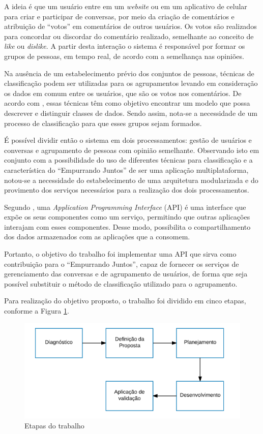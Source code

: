 A ideia é que um usuário entre em um \textit{website} ou em um aplicativo de celular para criar e participar de conversas, 
por meio da criação de comentários e atribuição de ``votos'' em comentários de outros usuários.
Os votos são realizados para concordar ou discordar do comentário realizado, semelhante ao conceito de \textit{like} ou \textit{dislike}.
A partir desta interação o sistema é responsável por formar os grupos de pessoas, em tempo real, de acordo com a semelhança nas opiniões.

Na ausência de um estabelecimento prévio dos conjuntos de pessoas, técnicas de classificação podem ser utilizadas para os agrupamentos
levando em consideração os dados em comum entre os usuários, que são os votos nos comentários.
De acordo com , essas técnicas
têm como objetivo encontrar um modelo que possa descrever e distinguir classes de dados.
Sendo assim, nota-se a necessidade de um processo de classificação para que esses grupos sejam formados.

É possível dividir então o sistema em dois processamentos: 
gestão de usuários e conversas e agrupamento de pessoas com opinião semelhante. 
Observando isto em conjunto com a possibilidade do uso de diferentes técnicas para classificação 
e a característica do ``Empurrando Juntos'' de ser uma aplicação multiplataforma, notou-se
a necessidade do estabelecimento de uma arquitetura modularizada e do provimento dos serviços necessários para a realização
dos dois processamentos.

Segundo , uma \textit{Application Programming Interface} (API)
é uma interface que expõe os seus componentes como um serviço, permitindo que outras aplicações interajam com esses 
componentes. Desse modo, possibilita o compartilhamento dos dados armazenados com as aplicações que a consomem.

Portanto, o objetivo do trabalho foi implementar uma API que sirva como contribuição para o ``Empurrando Juntos'',
capaz de fornecer os serviços de gerenciamento das conversas e de agrupamento de usuários, de forma que seja possível substituir
o método de classificação utilizado para o agrupamento.

Para realização do objetivo proposto, o trabalho foi dividido em cinco etapas, conforme a Figura \ref{fig:etapas_trabalho}. 

\begin{figure}[h!]
\centering
\includegraphics[scale=0.6]{figuras/etapas.png}
\caption{Etapas do trabalho}
\label{fig:etapas_trabalho}
\end{figure}

